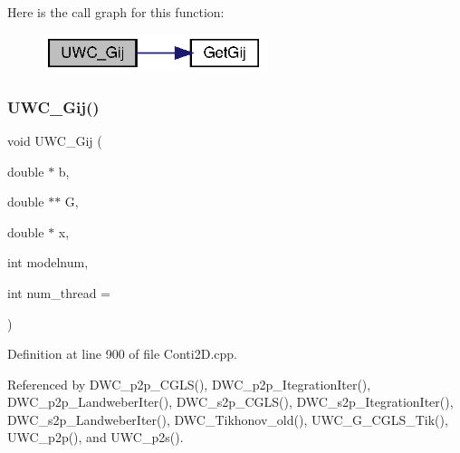 Here is the call graph for this function\+:
\nopagebreak
\begin{figure}[H]
\begin{center}
\leavevmode
\includegraphics[width=182pt]{Conti2D_8h_ac58c50337e14cc142ee9377c561c05fa_ac58c50337e14cc142ee9377c561c05fa_cgraph}
\end{center}
\end{figure}
\mbox{\label{Conti2D_8h_a234334c62ff3fa43eb0da53c34983b69_a234334c62ff3fa43eb0da53c34983b69}} 
\subsubsection{U\+W\+C\+\_\+\+Gij()\hspace{0.1cm}{\footnotesize\ttfamily [2/2]}}
{\footnotesize\ttfamily void U\+W\+C\+\_\+\+Gij (\begin{DoxyParamCaption}\item[{double $\ast$}]{b,  }\item[{double $\ast$$\ast$}]{G,  }\item[{double $\ast$}]{x,  }\item[{int}]{modelnum,  }\item[{int}]{num\+\_\+thread = {} }\end{DoxyParamCaption})}



Definition at line 900 of file Conti2\+D.\+cpp.



Referenced by D\+W\+C\+\_\+p2p\+\_\+\+C\+G\+L\+S(), D\+W\+C\+\_\+p2p\+\_\+\+Itegration\+Iter(), D\+W\+C\+\_\+p2p\+\_\+\+Landweber\+Iter(), D\+W\+C\+\_\+s2p\+\_\+\+C\+G\+L\+S(), D\+W\+C\+\_\+s2p\+\_\+\+Itegration\+Iter(), D\+W\+C\+\_\+s2p\+\_\+\+Landweber\+Iter(), D\+W\+C\+\_\+\+Tikhonov\+\_\+old(), U\+W\+C\+\_\+\+G\+\_\+\+C\+G\+L\+S\+\_\+\+Tik(), U\+W\+C\+\_\+p2p(), and U\+W\+C\+\_\+p2s().

